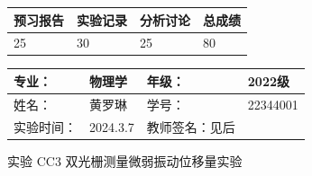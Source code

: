 \documentclass[dvipsnames, svgnames,a4paper,11pt]{article}
\begin{document}
	
	
	
	
	\begin{table}
		\renewcommand\arraystretch{1.7}
		\begin{tabularx}{\textwidth}{
				|X|X|X|X
				|X|X|X|X|}
			\hline
			\multicolumn{2}{|c|}{预习报告}&\multicolumn{2}{|c|}{实验记录}&\multicolumn{2}{|c|}{分析讨论}&\multicolumn{2}{|c|}{总成绩}\\
			\hline
			\LARGE25 & & \LARGE 30& & \LARGE25 & & \LARGE80 & \\
			\hline
		\end{tabularx}
	\end{table}
	
	
	\begin{table}
		\renewcommand\arraystretch{1.7}
		\begin{tabularx}{\textwidth}{|X|X|X|X|}
			\hline
			专业： &  物理学 &年级： & 2022级\\
			\hline
			姓名： & 黄罗琳 & 学号： & 22344001\\
			\hline
			实验时间： & 2024.3.7 & 教师签名：见后 & \\
			\hline
		\end{tabularx}
	\end{table}
	
	\begin{center}
		\LARGE 实验 CC3 \quad 双光栅测量微弱振动位移量实验
	\end{center}
	
	
\end{document}
